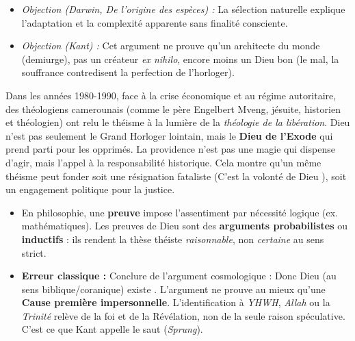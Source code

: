 \documentclass[11pt]{article}
\newcommand{\cle}[1]{{\popxbold\color{popdark}#1}}
\begin{document}
\begin{propriete}
\begin{itemize}
    \begin{itemize}
        \item \textit{Objection (Darwin, \emph{De l'origine des espèces}) :} La sélection naturelle explique l'adaptation et la complexité apparente sans finalité consciente.
        \item \textit{Objection (Kant) :} Cet argument ne prouve qu'un \guillemotleft architecte \guillemotright du monde (demiurge), pas un créateur \emph{ex nihilo}, encore moins un Dieu bon (le mal, la souffrance contredisent la perfection de l'horloger).
    \end{itemize}
\end{itemize}
\end{propriete}

\begin{exemplebox}
Dans les années 1980-1990, face à la crise économique et au régime autoritaire, des théologiens camerounais (comme le père Engelbert Mveng, jésuite, historien et théologien) ont relu le théisme à la lumière de la \emph{théologie de la libération}. Dieu n'est pas seulement le \guillemotleft Grand Horloger \guillemotright lointain, mais le \textbf{Dieu de l'Exode} qui prend parti pour les opprimés. La \guillemotleft providence \guillemotright n'est pas une magie qui dispense d'agir, mais l'appel à la responsabilité historique. Cela montre qu'un même théisme peut fonder soit une résignation fataliste (\guillemotleft C'est la volonté de Dieu \guillemotright), soit un engagement politique pour la justice.
\end{exemplebox}

\begin{attention}
\begin{itemize}
    \item En philosophie, une \textbf{preuve} impose l'assentiment par nécessité logique (ex. mathématiques). Les \guillemotleft preuves \guillemotright de Dieu sont des \textbf{arguments probabilistes} ou \textbf{inductifs} : ils rendent la thèse théiste \emph{raisonnable}, non \emph{certaine} au sens strict.
    \item \textbf{Erreur classique :} Conclure de l'argument cosmologique : \guillemotleft Donc Dieu (au sens biblique/coranique) existe \guillemotright. L'argument ne prouve au mieux qu'une \textbf{Cause première impersonnelle}. L'identification à \emph{YHWH}, \emph{Allah} ou la \emph{Trinité} relève de la \cle{foi} et de la \cle{Révélation}, non de la seule raison spéculative. C'est ce que Kant appelle le \guillemotleft saut \guillemotright (\emph{Sprung}).
\end{itemize}
\end{attention}
\end{document}
